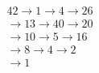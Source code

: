 \documentclass[preview]{standalone}
\begin{document}
\begin{align*}
42 \longrightarrow 1 \longrightarrow 4 \longrightarrow 26 \\\longrightarrow 13 \longrightarrow 40  \longrightarrow 20 \\\longrightarrow 10 \longrightarrow 5 \longrightarrow 16 \\\longrightarrow 8 \longrightarrow 4 \longrightarrow 2 \\\longrightarrow 1
\end{align*}
\end{document}
